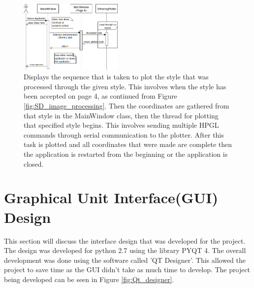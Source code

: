 \documentclass{article}
\begin{document}
\begin{figure}[h]
    \centering
    \includegraphics[width=0.45\textwidth]{SD_Plotting.png}
    \caption{Displays the sequence that is taken to plot the style that was processed through the given style. This involves when the style has been accepted on page 4, as continued from Figure \ref{fig:SD_image_processing}. Then the coordinates are gathered from that style in the MainWindow class, then the thread for plotting that specified style begins. This involves sending multiple HPGL commands through serial communication to the plotter. After this task is plotted and all coordinates that were made are complete then the application is restarted from the beginning or the application is closed.}
    \label{fig:SD_plotting}
\end{figure}
\clearpage
    \section{Graphical Unit Interface(GUI) Design}
This section will discuss the interface design that was developed for the project. The design was developed for python 2.7 using the library PYQT 4\cite{pyqt}. The overall development was done using the software called 'QT Designer'\cite{qt_designer}. This allowed the project to save time as the GUI didn't take as much time to develop. The project being developed can be seen in Figure \ref{fig:Qt_designer}.
\end{document}
